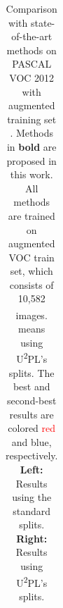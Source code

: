 \begin{table}[t]
{\begin{tabular}{c|cccccc|cccc}
\end{tabular}
}
\vspace{-0.2cm}
\caption{\textnormal{Comparison with state-of-the-art methods on PASCAL VOC 2012 with augmented training set \cite{hariharan2011semantic}. Methods in \textbf{bold} are proposed in this work. All methods are trained on augmented VOC train set, which consists of 10,582 images. \textsuperscript{\textdagger} means using U\textsuperscript{2}PL’s splits. The best and second-best results are colored \textcolor{red}{red} and {\color[HTML]{00B0F0} blue}, respectively.} \textbf{Left:} Results using the standard splits. \textbf{Right:} Results using U\textsuperscript{2}PL’s splits.}
\vspace{-0.3cm}
\label{table2}
\end{table}
